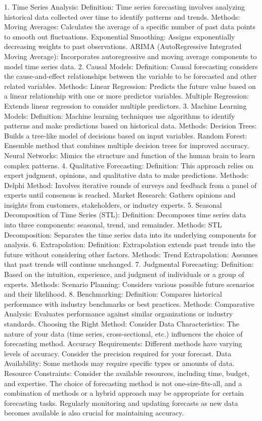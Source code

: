 1. Time Series Analysis:
Definition: Time series forecasting involves analyzing historical data collected over time to identify patterns and trends.
Methods:
Moving Averages: Calculates the average of a specific number of past data points to smooth out fluctuations.
Exponential Smoothing: Assigns exponentially decreasing weights to past observations.
ARIMA (AutoRegressive Integrated Moving Average): Incorporates autoregressive and moving average components to model time series data.
2. Causal Models:
Definition: Causal forecasting considers the cause-and-effect relationships between the variable to be forecasted and other related variables.
Methods:
Linear Regression: Predicts the future value based on a linear relationship with one or more predictor variables.
Multiple Regression: Extends linear regression to consider multiple predictors.
3. Machine Learning Models:
Definition: Machine learning techniques use algorithms to identify patterns and make predictions based on historical data.
Methods:
Decision Trees: Builds a tree-like model of decisions based on input variables.
Random Forest: Ensemble method that combines multiple decision trees for improved accuracy.
Neural Networks: Mimics the structure and function of the human brain to learn complex patterns.
4. Qualitative Forecasting:
Definition: This approach relies on expert judgment, opinions, and qualitative data to make predictions.
Methods:
Delphi Method: Involves iterative rounds of surveys and feedback from a panel of experts until consensus is reached.
Market Research: Gathers opinions and insights from customers, stakeholders, or industry experts.
5. Seasonal Decomposition of Time Series (STL):
Definition: Decomposes time series data into three components: seasonal, trend, and remainder.
Methods:
STL Decomposition: Separates the time series data into its underlying components for analysis.
6. Extrapolation:
Definition: Extrapolation extends past trends into the future without considering other factors.
Methods:
Trend Extrapolation: Assumes that past trends will continue unchanged.
7. Judgmental Forecasting:
Definition: Based on the intuition, experience, and judgment of individuals or a group of experts.
Methods:
Scenario Planning: Considers various possible future scenarios and their likelihood.
8. Benchmarking:
Definition: Compares historical performance with industry benchmarks or best practices.
Methods:
Comparative Analysis: Evaluates performance against similar organizations or industry standards.
Choosing the Right Method:
Consider Data Characteristics: The nature of your data (time series, cross-sectional, etc.) influences the choice of forecasting method.
Accuracy Requirements: Different methods have varying levels of accuracy. Consider the precision required for your forecast.
Data Availability: Some methods may require specific types or amounts of data.
Resource Constraints: Consider the available resources, including time, budget, and expertise.
The choice of forecasting method is not one-size-fits-all, and a combination of methods or a hybrid approach may be appropriate for certain forecasting tasks. Regularly monitoring and updating forecasts as new data becomes available is also crucial for maintaining accuracy.

